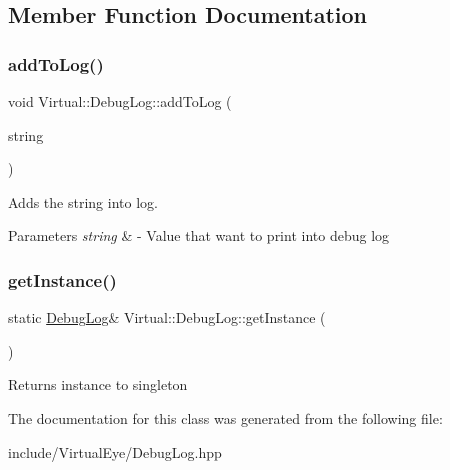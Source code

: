 \subsection{Member Function Documentation}
\hypertarget{class_virtual_1_1_debug_log_af629e3c39eb80538b8b62076fb02ad4b}{}\label{class_virtual_1_1_debug_log_af629e3c39eb80538b8b62076fb02ad4b} 
\subsubsection{\texorpdfstring{add\+To\+Log()}{addToLog()}}
{\footnotesize\ttfamily void Virtual\+::\+Debug\+Log\+::add\+To\+Log (\begin{DoxyParamCaption}\item[{std\+::string}]{string }\end{DoxyParamCaption})}



Adds the string into log. 


\begin{DoxyParams}{Parameters}
{\em string} & -\/ Value that want to print into debug log \\
\hline
\end{DoxyParams}
\hypertarget{class_virtual_1_1_debug_log_a7360c164a4fa8df9a68449bdf4c38ecf}{}\label{class_virtual_1_1_debug_log_a7360c164a4fa8df9a68449bdf4c38ecf} 
\subsubsection{\texorpdfstring{get\+Instance()}{getInstance()}}
{\footnotesize\ttfamily static \hyperlink{class_virtual_1_1_debug_log}{Debug\+Log}\& Virtual\+::\+Debug\+Log\+::get\+Instance (\begin{DoxyParamCaption}{ }\end{DoxyParamCaption})\hspace{0.3cm}{\ttfamily [static]}}

\begin{DoxyReturn}{Returns}
instance to singleton 
\end{DoxyReturn}


The documentation for this class was generated from the following file\+:\begin{DoxyCompactItemize}
\item 
include/\+Virtual\+Eye/Debug\+Log.\+hpp\end{DoxyCompactItemize}
